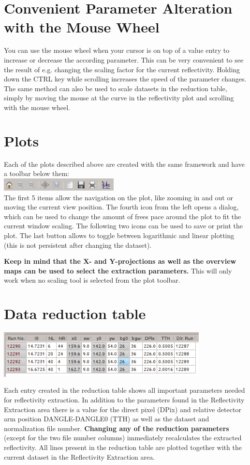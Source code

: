 \section{Convenient Parameter Alteration with the Mouse Wheel}
  You can use the mouse wheel when your cursor is on top of a value entry to increase or decrease the according parameter. 
  This can be very convenient to see the result of e.g. changing the scaling factor for the current reflectivity. Holding down the CTRL key while scrolling increases the speed of the parameter changes.
  The same method can also be used to scale datasets in the reduction table, simply by moving the mouse at the curve in the reflectivity plot and scrolling with the mouse wheel.
  
\section{Plots}
  Each of the plots described above are created with the same framework and have a toolbar below them:\\
  \includegraphics[width=6cm]{screenshots/plottoolbar.png}\\
  The first 5 items allow the navigation on the plot, like zooming in and out or moving the current view position.
  The fourth icon from the left opens a dialog, which can be used to change the amount of frees pace around the plot to fit the current window scaling.
  The following two icons can be used to save or print the plot. The last button allows to toggle between logarithmic and linear plotting (this is not persistent after changing the dataset).
  
  \textbf{Keep in mind that the X- and Y-projections as well as the overview maps can be used to select the extraction parameters.}
  This will only work when no scaling tool is selected from the plot toolbar.

\section{Data reduction table}
  \includegraphics[width=0.8\textwidth]{screenshots/reductiontable.png}

  Each entry created in the reduction table shows all important parameters needed for reflectivity extraction.
  In addition to the parameters found in the Reflectivity Extraction area there is a value for the direct pixel (DPix) and relative detector arm position DANGLE-DANGLE0 (TTH) as well as the dataset and normalization file number.
  \textbf{Changing any of the reduction parameters} (except for the two file number columns) immediately recalculates the extracted reflectivity.
  All lines present in the reduction table are plotted together with the current dataset in the Reflectivity Extraction area.

